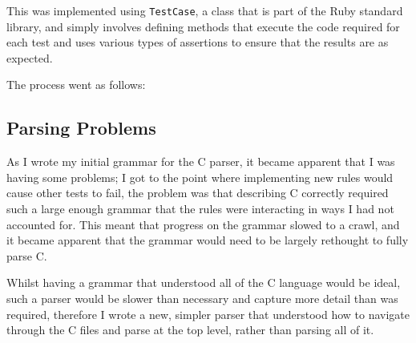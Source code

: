     This was implemented using \lstinline|TestCase|, a class that is part of the
    Ruby standard library, and simply involves defining methods that execute the
    code required for each test and uses various types of assertions to ensure
    that the results are as expected.

    The process went as follows:

    \begin{center}
    \end{center}

  \subsection{Parsing Problems}
    As I wrote my initial grammar for the C parser, it became apparent that I
    was having some problems; I got to the point where implementing new rules
    would cause other tests to fail, the problem was that describing C correctly
    required such a large enough grammar that the rules were interacting in ways
    I had not accounted for. This meant that progress on the grammar slowed to a
    crawl, and it became apparent that the grammar would need to be largely
    rethought to fully parse C.

    Whilst having a grammar that understood all of the C language would be
    ideal, such a parser would be slower than necessary and capture more detail
    than was required, therefore I wrote a new, simpler parser that understood
    how to navigate through the C files and parse at the top level, rather than
    parsing all of it.


